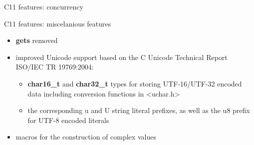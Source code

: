 \begin{frame}{C11 features: concurrency}
\begin{itemize}


    \end{itemize}
\end{frame}
\begin{frame}{C11 features: miscelanious features}
    \begin{itemize}
        \item \textbf{gets} removed
        \pause\item improved Unicode support based on the C Unicode Technical Report ISO/IEC TR 19769:2004:
            \begin{itemize}
                \item \textbf{char16\_t} and \textbf{char32\_t} types for storing UTF-16/UTF-32 encoded data including conversion functions in <uchar.h>
                \item the corresponding u and U string literal prefixes, as well as the u8 prefix for UTF-8 encoded literals
            \end{itemize}
        \pause\item macros for the construction of complex values
            
    \end{itemize}
\end{frame}

